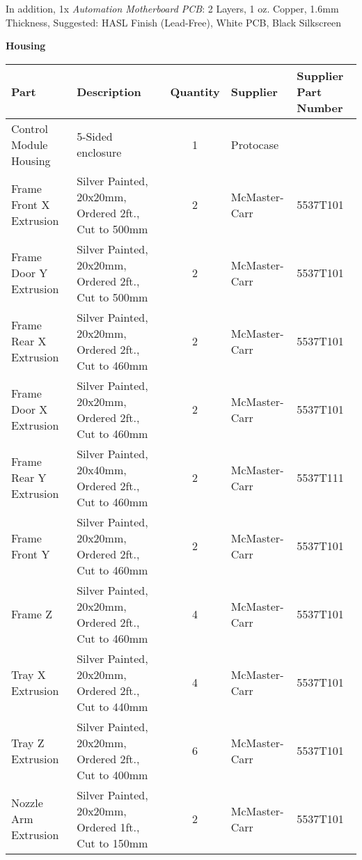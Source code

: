 In addition, 1x \textit{Automation Motherboard PCB}: 2 Layers, 1 oz. Copper, 1.6mm Thickness, Suggested: HASL Finish (Lead-Free), White PCB, Black Silkscreen

\textbf{Housing}\\

\begin{table}[!ht]
    \centering
    \begin{tabular}{|l|l|c|l|l|}
    \hline
        Part                    & Description                                           & Quantity  & Supplier          & Supplier Part Number  \\ \hline
        Control Module Housing  & 5-Sided enclosure                                     & 1         & Protocase         & ~                     \\ \hline
        Frame Front X Extrusion & Silver Painted, 20x20mm, Ordered 2ft., Cut to 500mm   & 2         & McMaster-Carr     & 5537T101              \\ \hline
        Frame Door Y Extrusion  & Silver Painted, 20x20mm, Ordered 2ft., Cut to 500mm   & 2         & McMaster-Carr     & 5537T101              \\ \hline
        Frame Rear X Extrusion  & Silver Painted, 20x20mm, Ordered 2ft., Cut to 460mm   & 2         & McMaster-Carr     & 5537T101              \\ \hline
        Frame Door X Extrusion  & Silver Painted, 20x20mm, Ordered 2ft., Cut to 460mm   & 2         & McMaster-Carr     & 5537T101              \\ \hline
        Frame Rear Y Extrusion  & Silver Painted, 20x40mm, Ordered 2ft., Cut to 460mm   & 2         & McMaster-Carr     & 5537T111              \\ \hline
        Frame Front Y           & Silver Painted, 20x20mm, Ordered 2ft., Cut to 460mm   & 2         & McMaster-Carr     & 5537T101              \\ \hline
        Frame Z                 & Silver Painted, 20x20mm, Ordered 2ft., Cut to 460mm   & 4         & McMaster-Carr     & 5537T101              \\ \hline
        Tray X Extrusion        & Silver Painted, 20x20mm, Ordered 2ft., Cut to 440mm   & 4         & McMaster-Carr     & 5537T101              \\ \hline
        Tray Z Extrusion        & Silver Painted, 20x20mm, Ordered 2ft., Cut to 400mm   & 6         & McMaster-Carr     & 5537T101              \\ \hline
        Nozzle Arm Extrusion    & Silver Painted, 20x20mm, Ordered 1ft., Cut to 150mm   & 2         & McMaster-Carr     & 5537T101              \\ \hline

\end{tabular}
\end{table}
